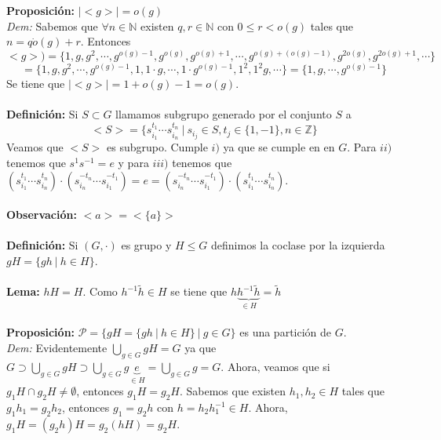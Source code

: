 \documentclass{article}
\begin{document}

\textbf{Proposición:} $|<g>|=o(g)$\\
\textit{Dem:} Sabemos que $\forall n\in\mathbb{N}$ existen $q,r\in\mathbb{N}$ con $0\le r < o(g)$ tales que $n=q\dot o(g)+r$. Entonces
$$
<g>)=\{1,g,g^2,\cdots,g^{o(g)-1}, g^{o(g)}, g^{o(g)+1}, \cdots, g^{o(g)+(o(g)-1)},g^{2o(g)},g^{2o(g)+1},\cdots\}
$$
$$
=\{1,g,g^2,\cdots,g^{o(g)-1}, 1, 1\cdot g, \cdots, 1\cdot g^{o(g)-1}, 1^2,1^2 g,\cdots\}=
\{1,g,\cdots,g^{o(g)-1}\}
$$
Se tiene que $|<g>|=1+o(g)-1=o(g)$.\\\\


\textbf{Definición:} Si $S\subset G$ llamamos subgrupo generado por el conjunto $S$ a
$$
<S>=\{s_{i_1}^{t_1}\cdots s_{i_n}^{t_n}\:|\: s_{i_j}\in S, t_j \in \{1,-1\}, n\in\mathbb{Z}\}
$$
Veamos que $<S>$ es subgrupo. Cumple $i)$ ya que se cumple en en $G$. Para $ii)$ tenemos que $s^1s^{-1}=e$ y para $iii)$ tenemos que $(s_{i_1}^{t_1}\cdots s_{i_n}^{t_n}) \cdot (s_{i_n}^{-t_n}\cdots s_{i_1}^{-t_1})=e=(s_{i_n}^{-t_n}\cdots s_{i_1}^{-t_1}) \cdot (s_{i_1}^{t_1}\cdots s_{i_n}^{t_n})$.\\\\
\textbf{Observación:} $<a>=<\{a\}>$\\\\


\textbf{Definición:} Si $(G,\cdot)$ es grupo y $H\le G$ definimos la coclase por la izquierda $gH=\{gh\:|\:h\in H\}$.\\\\


\textbf{Lema:} $hH=H$. Como $h^{-1}\tilde{h}\in H$ se tiene que $h\underbrace{h^{-1}\tilde{h}}_{\in H}=\tilde{h}$\\\\


\textbf{Proposición:} $\mathcal{P}=\{gH=\{gh\:|\:h\in H\}\:|\:g\in G\}$ es una partición de $G$.\\
\textit{Dem:} Evidentemente $\displaystyle\bigcup_{g\in G} gH = G$ ya que $G\supset\displaystyle\bigcup_{g\in G} gH \supset\displaystyle\bigcup_{g\in G} g\underbrace{e}_{\in H}=\displaystyle\bigcup_{g\in G} g = G$. Ahora, veamos que si $g_1H\cap g_2H\ne\emptyset$, entonces $g_1H=g_2H$. Sabemos que existen $h_1,h_2 \in H$ tales que $g_1h_1=g_2h_2$, entonces $g_1=g_2h$ con $h=h_2h_1^{-1}\in H$. Ahora, $g_1H=(g_2h)H=g_2(hH)=g_2H$.\\\\
\end{document}
